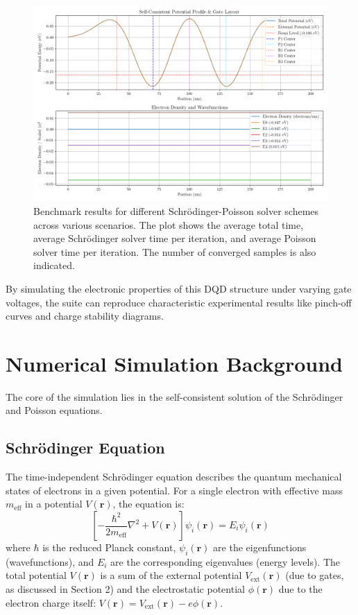 \documentclass{article}
\begin{document}
\begin{figure}[h!]
	\centering
	\includegraphics[width=\textwidth]{../figures/simulation_results.png}
	\caption{Benchmark results for different Schrödinger-Poisson solver schemes across various scenarios. The plot shows the average total time, average Schrödinger solver time per iteration, and average Poisson solver time per iteration. The number of converged samples is also indicated.}
	\label{fig:sim1d}
\end{figure}

By simulating the electronic properties of this DQD structure under varying gate voltages, the suite can reproduce characteristic experimental results like pinch-off curves and charge stability diagrams.

\section{Numerical Simulation Background}
The core of the simulation lies in the self-consistent solution of the Schrödinger and Poisson equations.

\subsection{Schrödinger Equation}
The time-independent Schrödinger equation describes the quantum mechanical states of electrons in a given potential. For a single electron with effective mass $m_{\text{eff}}$ in a potential $V(\mathbf{r})$, the equation is:
\begin{equation}
	\left[ -\frac{\hbar^2}{2m_{\text{eff}}} \nabla^2 + V(\mathbf{r}) \right] \psi_i(\mathbf{r}) = E_i \psi_i(\mathbf{r})
\end{equation}
where $\hbar$ is the reduced Planck constant, $\psi_i(\mathbf{r})$ are the eigenfunctions (wavefunctions), and $E_i$ are the corresponding eigenvalues (energy levels). The total potential $V(\mathbf{r})$ is a sum of the external potential $V_{\text{ext}}(\mathbf{r})$ (due to gates, as discussed in Section 2) and the electrostatic potential $\phi(\mathbf{r})$ due to the electron charge itself: $V(\mathbf{r}) = V_{\text{ext}}(\mathbf{r}) - e \phi(\mathbf{r})$.
\end{document}
